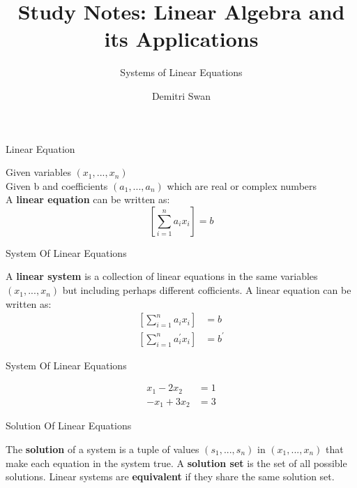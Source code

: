 \documentclass{beamer}
\title{Study Notes: Linear Algebra and its Applications}
\subtitle[short subtitle]{Systems of Linear Equations}
\author{Demitri Swan}
\date{}
\begin{document}
\begin{frame}
  \titlepage %
\end{frame}

\begin{frame}{Linear Equation}
\begin{definition}
Given variables $\left(x_{1}, ... , x_{n}\right)$\\
Given b and coefficients $\left(a_{1}, ... ,a_{n}\right)$ which are real or complex numbers\\
A \textbf{linear equation} can be written as:\\
\[ \left[ \sum_{i=1}^{n} a_{i}x_{i} \right] = b \]
\end{definition}
\end{frame}

\begin{frame}{System Of Linear Equations}
\begin{definition}
A \textbf{linear system} is a collection of linear equations in the same variables $\left(x_{1}, ... ,x_{n}\right)$ 
but including perhaps different cofficients. A linear equation can be written as:\\
\begin{align*}
\left[ \sum_{i=1}^{n} a_{i}x_{i} \right] &= b \\
\left[ \sum_{i=1}^{n} a^{\prime}_{i}x_{i} \right] &= b^{\prime}
\end{align*}
\end{definition}
\end{frame}

\begin{frame}{System Of Linear Equations}
\begin{example}
\begin{align*}
x_{1} - 2x_{2} &= 1\\
-x_{1} + 3x_{2} &= 3
\end{align*}
\end{example}
\end{frame}

\begin{frame}{Solution Of Linear Equations}
\begin{definition}
The \textbf{solution} of a system is a tuple of values $\left(s_{1}, ... , s_{n}\right)$ in $\left(x_{1}, ... ,x_{n}\right)$ 
that make each equation in the system true. A \textbf{solution set} is the set of all possible solutions. 
Linear systems are \textbf{equivalent} if they share the same solution set.
\end{definition}
\end{frame}

\begin{frame}{}
\end{frame}
\end{document}

